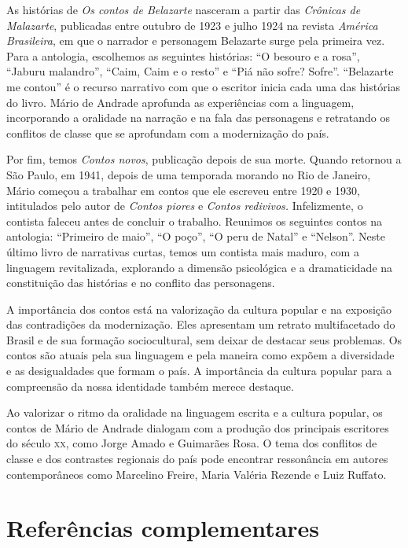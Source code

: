 \documentclass[12pt]{extarticle}
\begin{document}
{As histórias de \emph{Os contos de Belazarte} nasceram a partir das
\emph{Crônicas de Malazarte}, publicadas entre outubro de 1923 e julho
1924 na revista \emph{América Brasileira}, em que o narrador e
personagem Belazarte surge pela primeira vez. Para a antologia,
escolhemos as seguintes histórias: ``O besouro e a rosa'', ``Jaburu
malandro'', ``Caim, Caim e o resto'' e ``Piá não sofre? Sofre''.
``Belazarte me contou'' é o recurso narrativo com que o escritor inicia
cada uma das histórias do livro. Mário de Andrade aprofunda as
experiências com a linguagem, incorporando a oralidade na narração e na
fala das personagens e retratando os conflitos de classe que se
aprofundam com a modernização do país.

Por fim, temos \emph{Contos novos}, publicação depois de sua morte.
Quando retornou a São Paulo, em 1941, depois de uma temporada morando no
Rio de Janeiro, Mário começou a trabalhar em contos que ele escreveu
entre 1920 e 1930, intitulados pelo autor de \emph{Contos piores} e
\emph{Contos redivivos.} Infelizmente, o contista faleceu antes de
concluir o trabalho. Reunimos os seguintes contos na antologia:
``Primeiro de maio'', ``O poço'', ``O peru de Natal'' e ``Nelson''.
Neste último livro de narrativas curtas, temos um contista mais maduro,
com a linguagem revitalizada, explorando a dimensão psicológica e a
dramaticidade na constituição das histórias e no conflito das
personagens.

A importância dos contos está na valorização da cultura popular e na
exposição das contradições da modernização. Eles apresentam um retrato
multifacetado do Brasil e de sua formação sociocultural, sem deixar de
destacar seus problemas. Os contos são atuais pela sua linguagem e pela
maneira como expõem a diversidade e as desigualdades que formam o país.
A importância da cultura popular para a compreensão da nossa identidade
também merece destaque.

Ao valorizar o ritmo da oralidade na linguagem escrita e a cultura
popular, os contos de Mário de Andrade dialogam com a produção dos
principais escritores do século \textsc{xx}, como Jorge Amado e Guimarães Rosa. O
tema dos conflitos de classe e dos contrastes regionais do país pode
encontrar ressonância em autores contemporâneos como Marcelino Freire,
Maria Valéria Rezende e Luiz Ruffato.

\section{Referências complementares}

}
\end{document}
